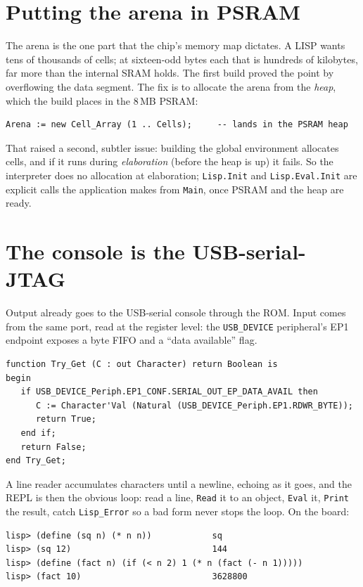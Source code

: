 \section{Putting the arena in PSRAM}

The arena is the one part that the chip's memory map dictates. A LISP wants tens of
thousands of cells; at sixteen-odd bytes each that is hundreds of kilobytes, far
more than the internal SRAM holds. The first build proved the point by overflowing
the data segment. The fix is to allocate the arena from the \emph{heap}, which the
build places in the 8\,MB PSRAM:

\begin{lstlisting}
Arena := new Cell_Array (1 .. Cells);     -- lands in the PSRAM heap
\end{lstlisting}

That raised a second, subtler issue: building the global environment allocates
cells, and if it runs during \emph{elaboration} (before the heap is up) it
fails. So the interpreter does no allocation at elaboration; \texttt{Lisp.Init} and
\texttt{Lisp.Eval.Init} are explicit calls the application makes from \texttt{Main},
once PSRAM and the heap are ready.

\section{The console is the USB-serial-JTAG}

Output already goes to the USB-serial console through the ROM. Input comes from the
same port, read at the register level: the \texttt{USB\_DEVICE} peripheral's EP1
endpoint exposes a byte FIFO and a ``data available'' flag.

\begin{lstlisting}
function Try_Get (C : out Character) return Boolean is
begin
   if USB_DEVICE_Periph.EP1_CONF.SERIAL_OUT_EP_DATA_AVAIL then
      C := Character'Val (Natural (USB_DEVICE_Periph.EP1.RDWR_BYTE));
      return True;
   end if;
   return False;
end Try_Get;
\end{lstlisting}

A line reader accumulates characters until a newline, echoing as it goes, and the
REPL is then the obvious loop: read a line, \texttt{Read} it to an object,
\texttt{Eval} it, \texttt{Print} the result, catch \texttt{Lisp\_Error} so a bad
form never stops the loop. On the board:

\begin{lstlisting}[style=sh]
lisp> (define (sq n) (* n n))            sq
lisp> (sq 12)                            144
lisp> (define (fact n) (if (< n 2) 1 (* n (fact (- n 1)))))
lisp> (fact 10)                          3628800
\end{lstlisting}

